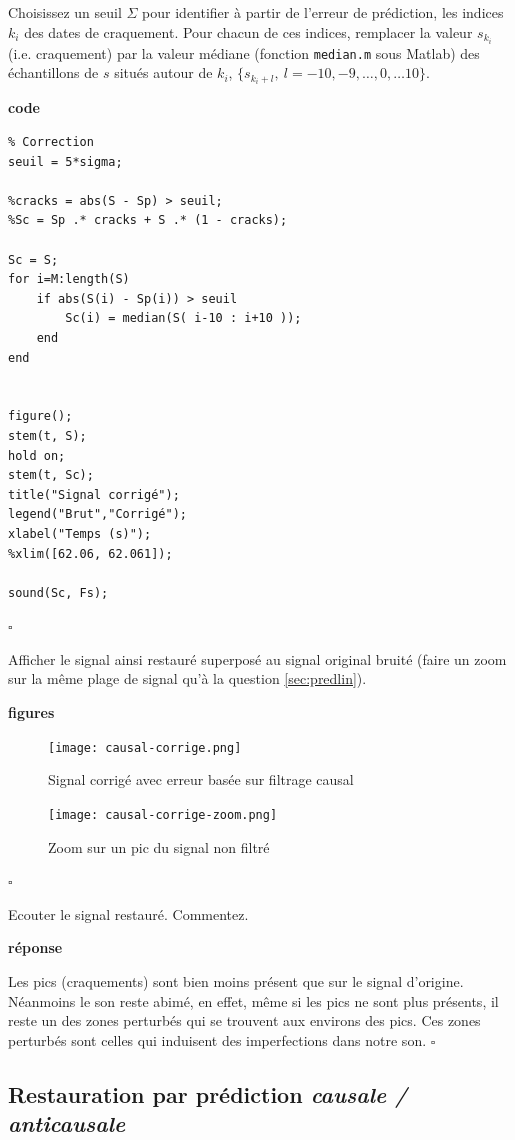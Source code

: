 \documentclass{article}
\newcommand{\debutrep}[1]{\color{blue}\begin{center} \hrulefill \textbf{ #1 } \hrulefill \end{center} }
\newcommand{\finrep}{\vspace*{5mm}\hfill $\square$\color{black}\vspace*{5mm}}
\begin{document}
Choisissez un seuil $\Sigma$ pour identifier à partir de l'erreur de prédiction, les indices $k_i$ des dates de craquement.  Pour chacun de ces indices,  remplacer la valeur $s_{k_i}$ (i.e. craquement) par la valeur médiane (fonction {\tt median.m} sous Matlab) des échantillons de $s$ situés autour de $k_i$, $\{s_{k_i+l},~l=-10, -9,\ldots, 0 , \ldots 10\}$.

\debutrep{code}
\begin{verbatim}
% Correction
seuil = 5*sigma;

%cracks = abs(S - Sp) > seuil;
%Sc = Sp .* cracks + S .* (1 - cracks);

Sc = S;
for i=M:length(S)
    if abs(S(i) - Sp(i)) > seuil
        Sc(i) = median(S( i-10 : i+10 )); 
    end
end


figure();
stem(t, S);
hold on;
stem(t, Sc);
title("Signal corrigé");
legend("Brut","Corrigé");
xlabel("Temps (s)");
%xlim([62.06, 62.061]);

sound(Sc, Fs);
\end{verbatim}
\finrep

Afficher le signal ainsi restauré  superposé au signal original bruité (faire un zoom sur la même plage de signal qu'à la question \ref{sec:predlin}).\\

\debutrep{figures}
\begin{figure}[H]
    \texttt{[image: causal-corrige.png]}
    \caption{Signal corrigé avec erreur basée sur filtrage causal}
\end{figure}
\begin{figure}[H]
    \texttt{[image: causal-corrige-zoom.png]}
    \caption{Zoom sur un pic du signal non filtré}
\end{figure}
\finrep

Ecouter le signal restauré. Commentez.

\debutrep{réponse}
Les pics (craquements) sont bien moins présent que sur le signal d'origine. Néanmoins le son reste abimé, en effet, même si les pics ne sont plus présents, il reste un des zones perturbés qui se trouvent aux environs des pics. Ces zones perturbés sont celles qui induisent des imperfections dans notre son.
\finrep


\subsection{Restauration par prédiction {\em causale / anticausale}}
\end{document}
